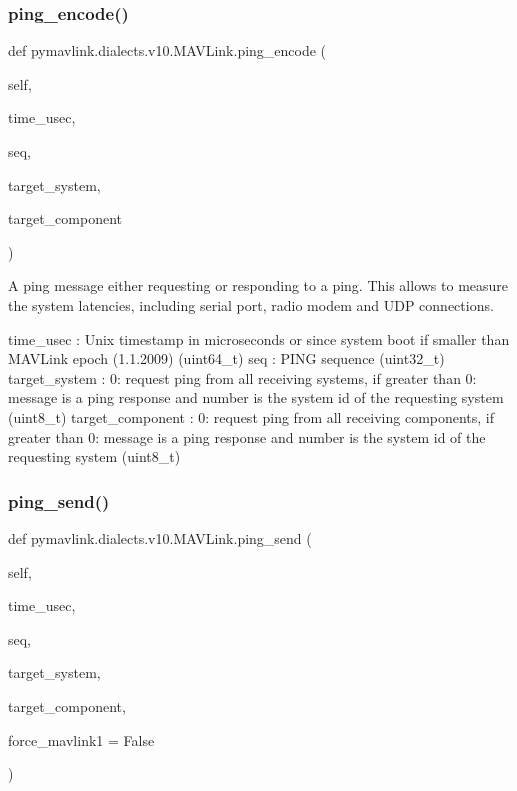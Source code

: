 \begin{DoxyVerb}
\begin{DoxyVerb}
\begin{DoxyVerb}
\begin{DoxyVerb}
\subsubsection{\texorpdfstring{ping\+\_\+encode()}{ping\_encode()}}
{\footnotesize\ttfamily def pymavlink.\+dialects.\+v10.\+M\+A\+V\+Link.\+ping\+\_\+encode (\begin{DoxyParamCaption}\item[{}]{self,  }\item[{}]{time\+\_\+usec,  }\item[{}]{seq,  }\item[{}]{target\+\_\+system,  }\item[{}]{target\+\_\+component }\end{DoxyParamCaption})}

\begin{DoxyVerb}A ping message either requesting or responding to a ping. This allows
to measure the system latencies, including serial
port, radio modem and UDP connections.

time_usec                 : Unix timestamp in microseconds or since system boot if smaller than MAVLink epoch (1.1.2009) (uint64_t)
seq                       : PING sequence (uint32_t)
target_system             : 0: request ping from all receiving systems, if greater than 0: message is a ping response and number is the system id of the requesting system (uint8_t)
target_component          : 0: request ping from all receiving components, if greater than 0: message is a ping response and number is the system id of the requesting system (uint8_t)\end{DoxyVerb}
 \mbox{\label{classpymavlink_1_1dialects_1_1v10_1_1MAVLink_a3dd7de5027f96e9b0d09837a97c76a5a}} 
\subsubsection{\texorpdfstring{ping\+\_\+send()}{ping\_send()}}
{\footnotesize\ttfamily def pymavlink.\+dialects.\+v10.\+M\+A\+V\+Link.\+ping\+\_\+send (\begin{DoxyParamCaption}\item[{}]{self,  }\item[{}]{time\+\_\+usec,  }\item[{}]{seq,  }\item[{}]{target\+\_\+system,  }\item[{}]{target\+\_\+component,  }\item[{}]{force\+\_\+mavlink1 = {\ttfamily False} }\end{DoxyParamCaption})}


\end{DoxyVerb}
\end{DoxyVerb}
\end{DoxyVerb}
\end{DoxyVerb}
